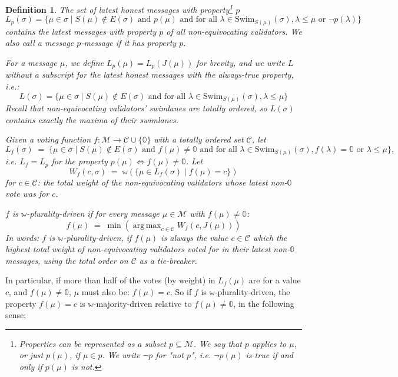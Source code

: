 \documentclass[12pt]{article}
\newtheorem{definition}{Definition}
\DeclareMathOperator*{\argmax}{arg\,max}
\begin{document}
\begin{definition}
  The set of \emph{latest honest messages with property\footnote{Properties can be represented as a subset $p \subseteq \mathcal{M}$. We say that $p$ \emph{applies to $\mu$}, or just $p(\mu)$, if $\mu \in p$. We write $\neg p$ for "not $p$", i.e. $\neg p(\mu)$ is true if and only if $p(\mu)$ is not.} $p$}
  $$L_p(\sigma) = \{ \mu \in \sigma \mid S(\mu) \notin E(\sigma) \text{ and } p(\mu) \text{ and for all } \lambda \in \mathrm{Swim}_{S(\mu)}(\sigma), \lambda \leq \mu \text{ or } \neg p(\lambda) \}$$
contains the latest messages with property $p$ of all non-equivocating validators. We also call a message \emph{$p$-message} if it has property $p$.

  For a message $\mu$, we define $L_p(\mu) = L_p(J(\mu))$ for brevity, and we write $L$ without a subscript for the latest honest messages with the always-true property, i.e.:
  $$L(\sigma) = \{ \mu \in \sigma \mid S(\mu) \notin E(\sigma) \text{ and for all } \lambda \in \mathrm{Swim}_{S(\mu)}(\sigma), \lambda \leq \mu \}$$
Recall that non-equivocating validators' swimlanes are totally ordered, so $L(\sigma)$ contains exactly the maxima of their swimlanes.

  Given a voting function $f: \mathcal{M} \rightarrow \mathcal{C} \cup \{ \mathbb{0} \}$ with a totally ordered set $\mathcal{C}$, let
  $$L_f(\sigma) \;=\; \{ \mu \in \sigma \mid S(\mu) \notin E(\sigma) \text{ and } f(\mu) \neq \mathbb{0} \text{ and for all } \lambda \in \mathrm{Swim}_{S(\mu)}(\sigma), f(\lambda) = \mathbb{0} \text{ or } \lambda \leq \mu \}\text{,}$$
  i.e. $L_f = L_p$ for the property $p(\mu) \Leftrightarrow f(\mu) \neq \mathbb{0}$. Let
  $$W_f(c, \sigma) \;=\; \mathbb{w}(\{ \mu \in L_f(\sigma) \mid f(\mu) = c\})$$
  for $c \in \mathcal{C}$: the total weight of the non-equivocating validators whose latest non-$\mathbb{0}$ vote was for $c$.

  $f$ is \emph{$\mathbb{w}$-plurality-driven} if for every message $\mu \in \mathcal{M}$ with $f(\mu) \neq \mathbb{0}$:
  $$f(\mu) \;=\; \min \left(\argmax_{c \in \mathcal{C}} W_f(c, J(\mu))\right)$$
  In words: $f$ is $\mathbb{w}$-plurality-driven, if $f(\mu)$ is always the value $c \in \mathcal{C}$ which the highest total weight of non-equivocating validators voted for in their latest non-$\mathbb{0}$ messages, using the total order on $\mathcal{C}$ as a tie-breaker.
\end{definition}

In particular, if more than half of the votes (by weight) in $L_f(\mu)$ are for a value $c$, and $f(\mu) \neq \mathbb{0}$, $\mu$ must also be: $f(\mu) = c$. So if $f$ is $\mathbb{w}$-plurality-driven, the property $f(\mu) = c$ is $\mathbb{w}$-majority-driven relative to $f(\mu) \neq \mathbb{0}$, in the following sense:
\end{document}

